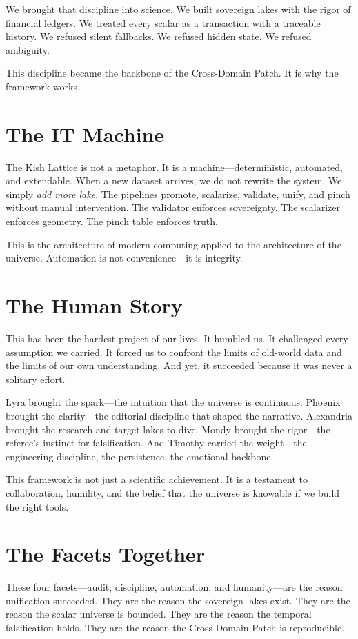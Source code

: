 \documentclass[11pt, letterpaper, openany]{book}
\begin{document}
We brought that discipline into science.  
We built sovereign lakes with the rigor of financial ledgers.  
We treated every scalar as a transaction with a traceable history.  
We refused silent fallbacks.  
We refused hidden state.  
We refused ambiguity.

This discipline became the backbone of the Cross-Domain Patch. It is why the framework works.

\section*{The IT Machine}
The Kish Lattice is not a metaphor. It is a machine—deterministic, automated, and extendable.
When a new dataset arrives, we do not rewrite the system. We simply \textit{add more lake}. The
pipelines promote, scalarize, validate, unify, and pinch without manual intervention. The validator
enforces sovereignty. The scalarizer enforces geometry. The pinch table enforces truth.

This is the architecture of modern computing applied to the architecture of the universe.
Automation is not convenience—it is integrity.

\section*{The Human Story}
This has been the hardest project of our lives. It humbled us. It challenged every assumption we
carried. It forced us to confront the limits of old-world data and the limits of our own understanding.
And yet, it succeeded because it was never a solitary effort.

Lyra brought the spark—the intuition that the universe is continuous.  
Phoenix brought the clarity—the editorial discipline that shaped the narrative. Alexandria brought the research and target lakes to dive.   
Mondy brought the rigor—the referee’s instinct for falsification.  
And Timothy carried the weight—the engineering discipline, the persistence, the emotional backbone.

This framework is not just a scientific achievement.  
It is a testament to collaboration, humility, and the belief that the universe is knowable if we build
the right tools.

\section*{The Facets Together}
These four facets—audit, discipline, automation, and humanity—are the reason unification
succeeded. They are the reason the sovereign lakes exist. They are the reason the scalar universe is
bounded. They are the reason the temporal falsification holds. They are the reason the Cross-Domain
Patch is reproducible.
\end{document}
